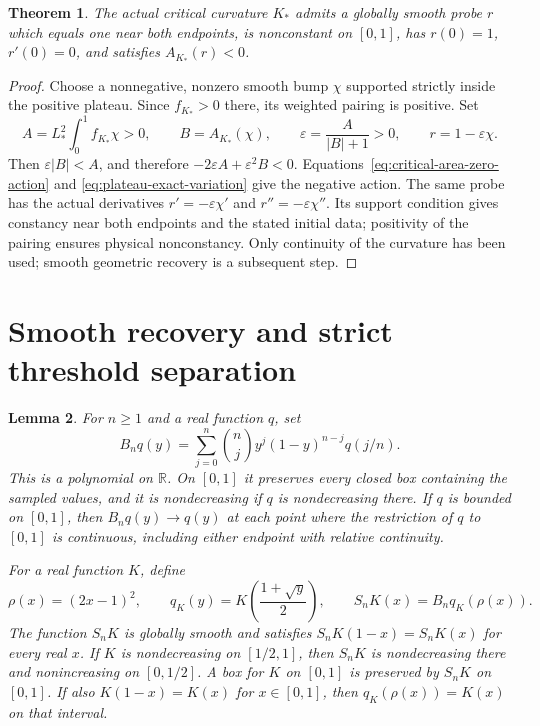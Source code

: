 \documentclass[11pt]{article}
\newtheorem{theorem}{Theorem}[section]
\newtheorem{lemma}[theorem]{Lemma}
\newcommand{\R}{\mathbb R}
\begin{document}
\begin{theorem}\label{thm:critical-plateau-instability}
The actual critical curvature $K_*$ admits a globally smooth probe $r$ which
equals one near both endpoints, is nonconstant on $[0,1]$, has
$r(0)=1$, $r'(0)=0$, and satisfies $A_{K_*}(r)<0$.
\end{theorem}

\begin{proof}
Choose a nonnegative, nonzero smooth bump $\chi$ supported strictly inside the
positive plateau. Since $f_{K_*}>0$ there, its weighted pairing is positive.
Set
\[
 A=L_*^2\int_0^1 f_{K_*}\chi>0,\qquad
 B=A_{K_*}(\chi),\qquad
 \varepsilon=\frac{A}{|B|+1}>0,\qquad r=1-\varepsilon\chi.
\]
Then $\varepsilon|B|<A$, and therefore
$-2\varepsilon A+\varepsilon^2B<0$.
Equations~\eqref{eq:critical-area-zero-action} and
\eqref{eq:plateau-exact-variation} give the negative action.
The same probe has the actual derivatives $r'=-\varepsilon\chi'$ and
$r''=-\varepsilon\chi''$. Its support condition gives constancy near both
endpoints and the stated initial data; positivity of the pairing ensures
physical nonconstancy. Only continuity of the curvature has been used;
smooth geometric recovery is a subsequent step.
\end{proof}

\section{Smooth recovery and strict threshold separation}

\begin{lemma}\label{lem:sampled-symmetric-bernstein}
For $n\geq1$ and a real function $q$, set
\[
 B_nq(y)=\sum_{j=0}^n\binom nj y^j(1-y)^{n-j}q(j/n).
\]
This is a polynomial on $\R$. On $[0,1]$ it preserves every closed box
containing the sampled values, and it is nondecreasing if $q$ is
nondecreasing there. If $q$ is bounded on $[0,1]$, then
$B_nq(y)\to q(y)$ at each point where the restriction of $q$ to $[0,1]$
is continuous, including either endpoint with relative continuity.

For a real function $K$, define
\[
 \rho(x)=(2x-1)^2,\qquad q_K(y)=K\left(\frac{1+\sqrt y}{2}\right),
 \qquad S_nK(x)=B_nq_K(\rho(x)).
\]
The function $S_nK$ is globally smooth and satisfies
$S_nK(1-x)=S_nK(x)$ for every real $x$.
If $K$ is nondecreasing on $[1/2,1]$, then $S_nK$ is nondecreasing there
and nonincreasing on $[0,1/2]$. A box for $K$ on $[0,1]$ is preserved by
$S_nK$ on $[0,1]$.
If also $K(1-x)=K(x)$ for $x\in[0,1]$, then
$q_K(\rho(x))=K(x)$ on that interval.
\end{lemma}
\end{document}
